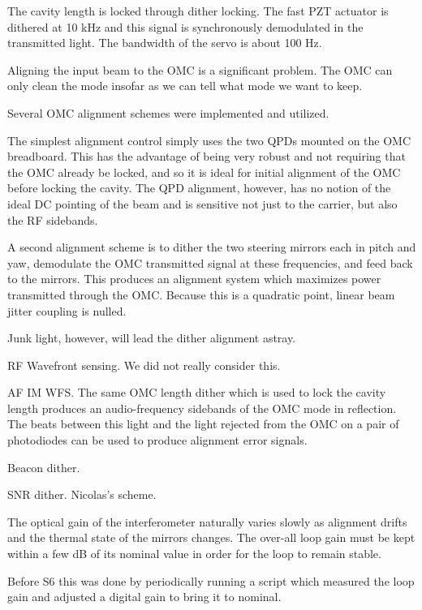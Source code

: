 
The cavity length is locked through dither locking.  The fast PZT
actuator is dithered at 10 kHz and this signal is synchronously
demodulated in the transmitted light.  The bandwidth of the servo is
about 100 Hz.


Aligning the input beam to the OMC is a significant problem.  The OMC
can only clean the mode insofar as we can tell what mode we want to
keep.

Several OMC alignment schemes were implemented and utilized.

The simplest alignment control simply uses the two QPDs mounted on the
OMC breadboard.  This has the advantage of being very robust and not
requiring that the OMC already be locked, and so it is ideal for
initial alignment of the OMC before locking the cavity.  The QPD
alignment, however, has no notion of the ideal DC pointing of the beam
and is sensitive not just to the carrier, but also the RF sidebands.

A second alignment scheme is to dither the two steering mirrors each
in pitch and yaw, demodulate the OMC transmitted signal at these
frequencies, and feed back to the mirrors.  This produces an alignment
system which maximizes power transmitted through the OMC.  Because
this is a quadratic point, linear beam jitter coupling is nulled.

Junk light, however, will lead the dither alignment astray.

RF Wavefront sensing.  We did not really consider this.

AF IM WFS.  The same OMC length dither which is used to lock the cavity
length produces an audio-frequency sidebands of the OMC mode in
reflection.  The beats between this light and the light rejected from
the OMC on a pair of photodiodes can be used to produce alignment
error signals.

Beacon dither.  

SNR dither.  Nicolas's scheme.


The optical gain of the interferometer naturally varies slowly as
alignment drifts and the thermal state of the mirrors changes.  The
over-all loop gain must be kept within a few dB of its nominal value
in order for the loop to remain stable.

Before S6 this was done by periodically running a script which
measured the loop gain and adjusted a digital gain to bring it to
nominal.

